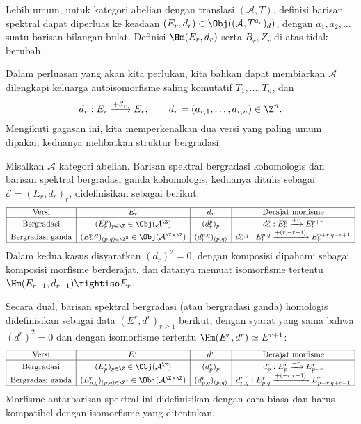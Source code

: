 Lebih umum, untuk kategori abelian dengan translasi $(\mathcal{A},T)$,
definisi barisan spektral dapat diperluas ke keadaan
$(E_r,d_r)\in\Obj((\mathcal{A},T^{a_r})_d)$, dengan
$a_1,a_2,\ldots$ suatu barisan bilangan bulat. Definisi $\Hm(E_r,d_r)$ serta
$B_r,Z_r$ di atas tidak berubah.

Dalam perluasan yang akan kita perlukan, kita bahkan dapat membiarkan
$\mathcal{A}$ dilengkapi keluarga autoisomorfisme saling komutatif
$T_1,\ldots,T_n$, dan
\[ d_r:E_r\xrightarrow{+\vec{a}_r}E_r,\qquad
	\vec{a}_r=(a_{r,1},\ldots,a_{r,n})\in\Z^n. \]
Mengikuti gagasan ini, kita memperkenalkan dua versi yang paling umum dipakai;
keduanya melibatkan struktur bergradasi.

\begin{definition}
\label{def:graded-spectral-sequence}
	Misalkan $\mathcal{A}$ kategori abelian. Barisan spektral bergradasi
	kohomologis dan barisan spektral bergradasi ganda kohomologis, keduanya
	ditulis sebagai $\mathscr{E}=(E_r,d_r)_r$, didefinisikan sebagai berikut.
	\[\begin{array}{|c|c|c|c|} \hline
		\text{Versi} & E_r & d_r & \text{Derajat morfisme} \\ \hline
		\text{Bergradasi} & (E_r^p)_{p\in\Z}\in\Obj(\mathcal{A}^{\Z})
		& (d_r^p)_p & d_r^p:E_r^p\xrightarrow{+r}E_r^{p+r} \\
		\text{Bergradasi ganda} &
		(E_r^{p,q})_{(p,q)\in\Z^2}\in\Obj(\mathcal{A}^{\Z\times\Z})
		& (d_r^{p,q})_{(p,q)} &
		d_r^{p,q}:E_r^{p,q}\xrightarrow{+(r,-r+1)}E_r^{p+r,q-r+1}
		\\ \hline
	\end{array}\]
	Dalam kedua kasus disyaratkan $(d_r)^2=0$, dengan komposisi dipahami
	sebagai komposisi morfisme berderajat, dan datanya memuat isomorfisme
	tertentu $\Hm(E_{r-1},d_{r-1})\rightiso E_r$.

	Secara dual, barisan spektral bergradasi (atau bergradasi ganda) homologis
	didefinisikan sebagai data $(E^r,d^r)_{r\geq1}$ berikut, dengan syarat yang
	sama bahwa $(d^r)^2=0$ dan dengan isomorfisme tertentu
	$\Hm(E^r,d^r)\simeq E^{r+1}$:
	\[\begin{array}{|c|c|c|c|} \hline
		\text{Versi} & E^r & d^r & \text{Derajat morfisme} \\ \hline
		\text{Bergradasi} & (E^r_p)_{p\in\Z}\in\Obj(\mathcal{A}^{\Z})
		& (d^r_p)_p & d^r_p:E^r_p\xrightarrow{-r}E^r_{p-r} \\
		\text{Bergradasi ganda} &
		(E^r_{p,q})_{(p,q)\in\Z^2}\in\Obj(\mathcal{A}^{\Z\times\Z})
		& (d^r_{p,q})_{(p,q)} &
		d^r_{p,q}:E^r_{p,q}\xrightarrow{+(-r,r-1)}E^r_{p-r,q+r-1}
		\\ \hline
	\end{array}\]
	Morfisme antarbarisan spektral ini didefinisikan dengan cara
	biasa dan harus kompatibel dengan isomorfisme yang ditentukan.
\end{definition}

